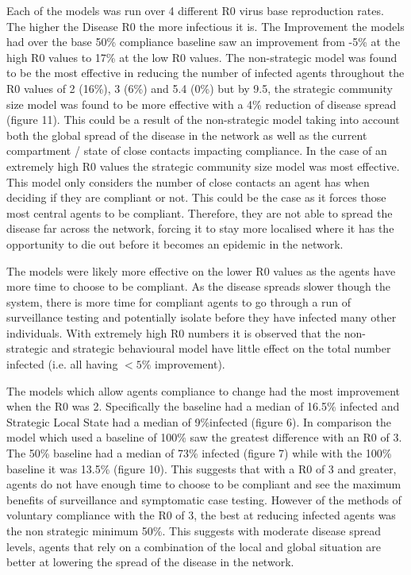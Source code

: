 \documentclass{article}
\begin{document}
Each of the models was run over 4 different R0 virus base reproduction rates. The higher the Disease R0 the more infectious it is. The Improvement the models had over the base 50\% compliance baseline saw an improvement from -5\% at the high R0 values to 17\% at the low R0 values. The non-strategic model was found to be the most effective in reducing the number of infected agents throughout the R0 values of 2 (16\%), 3 (6\%) and 5.4 (0\%) but by 9.5, the strategic community size model was found to be more effective with a 4\% reduction of disease spread (figure 11). This could be a result of the non-strategic model taking into account both the global spread of the disease in the network as well as the current compartment / state of close contacts impacting compliance. In the case of an extremely high R0 values the strategic community size model was most effective.  This model only considers the number of close contacts an agent has when deciding if they are compliant or not. This could be the case as it forces those most central agents to be compliant. Therefore, they are not able to spread the disease far across the network, forcing it to stay more localised where it has the opportunity to die out before it becomes an epidemic in the network.\newline 

The models were likely more effective on the lower R0 values as the agents have more time to choose to be compliant. As the disease spreads slower though the system, there is more time for compliant agents to go through a run of surveillance testing and potentially isolate before they have infected many other individuals. With extremely high R0 numbers it is observed that the non-strategic and strategic behavioural model have little effect on the total number infected (i.e. all having $< 5$\% improvement). \newline 

The models which allow agents compliance to change had the most improvement when the R0 was 2. Specifically the baseline had a median of 16.5\% infected and Strategic Local State had a median of 9\%infected (figure 6). In comparison the model which used a baseline of 100\% saw the greatest difference with an R0 of 3. The 50\% baseline had a median of 73\% infected (figure 7) while with the 100\% baseline it was 13.5\% (figure 10). This suggests that with a R0 of 3 and greater, agents do not have enough time to choose to be compliant and see the maximum benefits of surveillance and symptomatic case testing. However of the methods of voluntary compliance with the R0 of 3, the best at reducing infected agents was the non strategic minimum 50\%. This suggests with moderate disease spread levels, agents that rely on a combination of the local and global situation are better at lowering the spread of the disease in the network. \newline
\newpage
\end{document}
